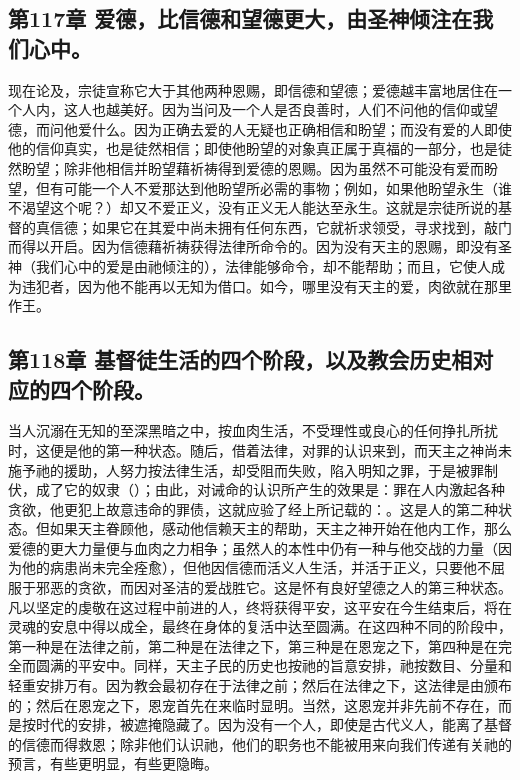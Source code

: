 

\subsection{第117章 爱德，比信德和望德更大，由圣神倾注在我们心中。}

现在论及，宗徒宣称它大于其他两种恩赐，即信德和望德；爱德越丰富地居住在一个人内，这人也越美好。因为当问及一个人是否良善时，人们不问他的信仰或望德，而问他爱什么。因为正确去爱的人无疑也正确相信和盼望；而没有爱的人即使他的信仰真实，也是徒然相信；即使他盼望的对象真正属于真福的一部分，也是徒然盼望；除非他相信并盼望藉祈祷得到爱德的恩赐。因为虽然不可能没有爱而盼望，但有可能一个人不爱那达到他盼望所必需的事物；例如，如果他盼望永生（谁不渴望这个呢？）却又不爱正义，没有正义无人能达至永生。这就是宗徒所说的基督的真信德；如果它在其爱中尚未拥有任何东西，它就祈求领受，寻求找到，敲门而得以开启。因为信德藉祈祷获得法律所命令的。因为没有天主的恩赐，即没有圣神（我们心中的爱是由祂倾注的），法律能够命令，却不能帮助；而且，它使人成为违犯者，因为他不能再以无知为借口。如今，哪里没有天主的爱，肉欲就在那里作王。\par


\subsection{第118章 基督徒生活的四个阶段，以及教会历史相对应的四个阶段。}

当人沉溺在无知的至深黑暗之中，按血肉生活，不受理性或良心的任何挣扎所扰时，这便是他的第一种状态。随后，借着法律，对罪的认识来到，而天主之神尚未施予祂的援助，人努力按法律生活，却受阻而失败，陷入明知之罪，于是被罪制伏，成了它的奴隶（）；由此，对诫命的认识所产生的效果是：罪在人内激起各种贪欲，他更犯上故意违命的罪债，这就应验了经上所记载的：。这是人的第二种状态。但如果天主眷顾他，感动他信赖天主的帮助，天主之神开始在他内工作，那么爱德的更大力量便与血肉之力相争；虽然人的本性中仍有一种与他交战的力量（因为他的病患尚未完全痊愈），但他因信德而活义人生活，并活于正义，只要他不屈服于邪恶的贪欲，而因对圣洁的爱战胜它。这是怀有良好望德之人的第三种状态。凡以坚定的虔敬在这过程中前进的人，终将获得平安，这平安在今生结束后，将在灵魂的安息中得以成全，最终在身体的复活中达至圆满。在这四种不同的阶段中，第一种是在法律之前，第二种是在法律之下，第三种是在恩宠之下，第四种是在完全而圆满的平安中。同样，天主子民的历史也按祂的旨意安排，祂按数目、分量和轻重安排万有。因为教会最初存在于法律之前；然后在法律之下，这法律是由颁布的；然后在恩宠之下，恩宠首先在来临时显明。当然，这恩宠并非先前不存在，而是按时代的安排，被遮掩隐藏了。因为没有一个人，即使是古代义人，能离了基督的信德而得救恩；除非他们认识祂，他们的职务也不能被用来向我们传递有关祂的预言，有些更明显，有些更隐晦。\par

